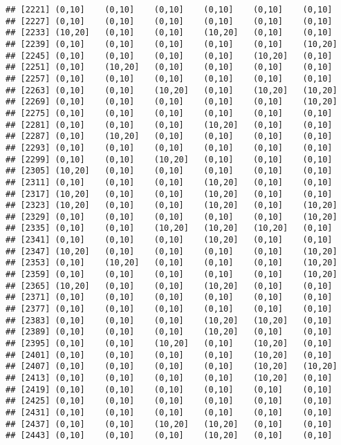 \documentclass[]{article}
\begin{document}
\begin{verbatim}
## [2221] (0,10]    (0,10]    (0,10]    (0,10]    (0,10]    (0,10]   
## [2227] (0,10]    (0,10]    (0,10]    (0,10]    (0,10]    (0,10]   
## [2233] (10,20]   (0,10]    (0,10]    (10,20]   (0,10]    (0,10]   
## [2239] (0,10]    (0,10]    (0,10]    (0,10]    (0,10]    (10,20]  
## [2245] (0,10]    (0,10]    (0,10]    (0,10]    (10,20]   (0,10]   
## [2251] (0,10]    (10,20]   (0,10]    (0,10]    (0,10]    (0,10]   
## [2257] (0,10]    (0,10]    (0,10]    (0,10]    (0,10]    (0,10]   
## [2263] (0,10]    (0,10]    (10,20]   (0,10]    (10,20]   (10,20]  
## [2269] (0,10]    (0,10]    (0,10]    (0,10]    (0,10]    (10,20]  
## [2275] (0,10]    (0,10]    (0,10]    (0,10]    (0,10]    (0,10]   
## [2281] (0,10]    (0,10]    (0,10]    (10,20]   (0,10]    (0,10]   
## [2287] (0,10]    (10,20]   (0,10]    (0,10]    (0,10]    (0,10]   
## [2293] (0,10]    (0,10]    (0,10]    (0,10]    (0,10]    (0,10]   
## [2299] (0,10]    (0,10]    (10,20]   (0,10]    (0,10]    (0,10]   
## [2305] (10,20]   (0,10]    (0,10]    (0,10]    (0,10]    (0,10]   
## [2311] (0,10]    (0,10]    (0,10]    (10,20]   (0,10]    (0,10]   
## [2317] (10,20]   (0,10]    (0,10]    (10,20]   (0,10]    (0,10]   
## [2323] (10,20]   (0,10]    (0,10]    (10,20]   (0,10]    (10,20]  
## [2329] (0,10]    (0,10]    (0,10]    (0,10]    (0,10]    (10,20]  
## [2335] (0,10]    (0,10]    (10,20]   (10,20]   (10,20]   (0,10]   
## [2341] (0,10]    (0,10]    (0,10]    (10,20]   (0,10]    (0,10]   
## [2347] (10,20]   (0,10]    (0,10]    (0,10]    (0,10]    (10,20]  
## [2353] (0,10]    (10,20]   (0,10]    (0,10]    (0,10]    (10,20]  
## [2359] (0,10]    (0,10]    (0,10]    (0,10]    (0,10]    (10,20]  
## [2365] (10,20]   (0,10]    (0,10]    (10,20]   (0,10]    (0,10]   
## [2371] (0,10]    (0,10]    (0,10]    (0,10]    (0,10]    (0,10]   
## [2377] (0,10]    (0,10]    (0,10]    (0,10]    (0,10]    (0,10]   
## [2383] (0,10]    (0,10]    (0,10]    (10,20]   (10,20]   (0,10]   
## [2389] (0,10]    (0,10]    (0,10]    (10,20]   (0,10]    (0,10]   
## [2395] (0,10]    (0,10]    (10,20]   (0,10]    (10,20]   (0,10]   
## [2401] (0,10]    (0,10]    (0,10]    (0,10]    (10,20]   (0,10]   
## [2407] (0,10]    (0,10]    (0,10]    (0,10]    (10,20]   (10,20]  
## [2413] (0,10]    (0,10]    (0,10]    (0,10]    (10,20]   (0,10]   
## [2419] (0,10]    (0,10]    (0,10]    (0,10]    (0,10]    (0,10]   
## [2425] (0,10]    (0,10]    (0,10]    (0,10]    (0,10]    (0,10]   
## [2431] (0,10]    (0,10]    (0,10]    (0,10]    (0,10]    (0,10]   
## [2437] (0,10]    (0,10]    (10,20]   (10,20]   (0,10]    (0,10]   
## [2443] (0,10]    (0,10]    (0,10]    (10,20]   (0,10]    (0,10]   

\end{verbatim}
\end{document}
